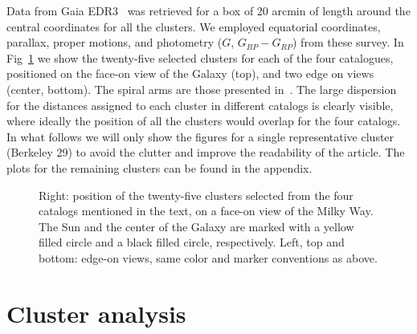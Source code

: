 \documentclass[draft]{aa}
\begin{document}
 Data from Gaia EDR3~\citep{Gaia_2016,Gaia_EDR3} was retrieved for a box of 20
 arcmin of length around the central coordinates for all the clusters. We
 employed equatorial coordinates, parallax, proper motions, and photometry
 ($G$, $G_{BP}-G_{RP}$) from these survey.
 In Fig~\ref{fig:MWmap} we show the twenty-five selected clusters for each of
 the four catalogues, positioned on the face-on view of the Galaxy (top), and
 two edge on views (center, bottom). The spiral arms are those presented
 in~\cite{Momany_2006}. The large dispersion for the distances
 assigned to each cluster in different catalogs is clearly visible, where
 ideally the position of all the clusters would overlap for the four catalogs.\\

 In what follows we will only show the figures for a single representative
 cluster (Berkeley 29) to avoid the clutter and improve the readability of the
 article. The plots for the remaining clusters can be found in the appendix.

 \begin{figure}
  \caption{Right: position of the twenty-five clusters selected from the four
  catalogs mentioned in the text, on a face-on view of the Milky Way. The Sun
  and the center of the Galaxy are marked with a yellow filled circle and a
  black filled circle, respectively. Left, top and bottom: edge-on views,
  same color and marker conventions as above.}
  \label{fig:MWmap}
 \end{figure}





\section{Cluster analysis}
 \label{sec:clust_analy}
\end{document}
